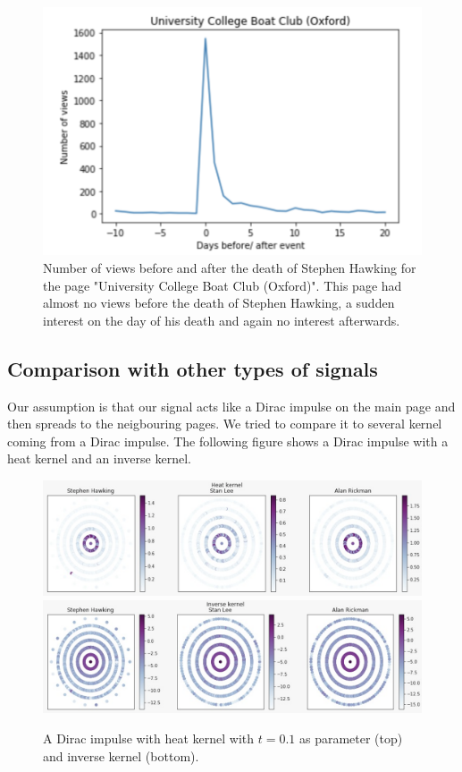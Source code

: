 \documentclass[conference]{IEEEtran}
\begin{document}
\begin{figure}[!htb]
  \includegraphics[width=\linewidth]{uniboat.png}
\caption{Number of views before and after the death of Stephen Hawking for the page "University College Boat Club (Oxford)". This page had almost no views before the death of Stephen Hawking, a sudden interest on the day of his death and again no interest afterwards.}
\end{figure}

\subsection{Comparison with other types of signals}

Our assumption is that our signal acts like a Dirac impulse on the main page and then spreads to the neigbouring pages. We tried to compare it to several kernel coming from a Dirac impulse. The following figure shows a Dirac impulse with a heat kernel and an inverse kernel. 

\begin{figure}[!htb]
\includegraphics[width=\linewidth]{HeatKernel.png}
\includegraphics[width=\linewidth]{InverseKernel.png}
\caption{A Dirac impulse with heat kernel  with $t=0.1$ as parameter (top) and inverse kernel (bottom).} 
\end{figure}
\end{document}
